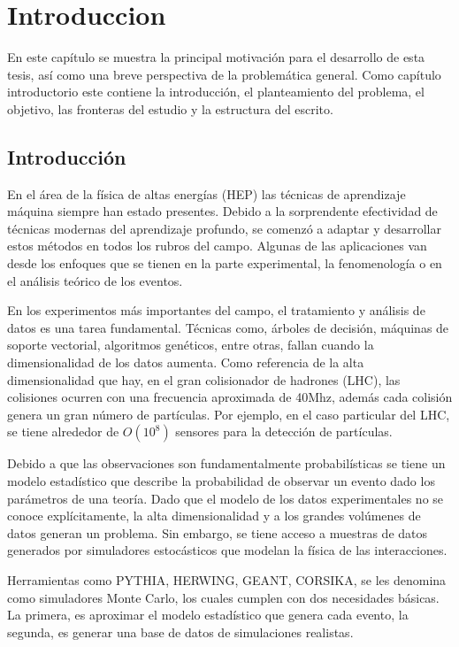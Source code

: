 \chapter{Introduccion}

\label{Chapter1}

En este capítulo se muestra la principal motivación para el desarrollo de esta tesis,
así como una breve perspectiva de la problemática general. Como capítulo introductorio este contiene la introducción, el planteamiento del problema, el objetivo, las fronteras del estudio y la estructura del escrito.

\section{Introducción}

En el área de la física de altas energías (HEP) las técnicas de aprendizaje máquina siempre han estado presentes. Debido a la sorprendente efectividad de técnicas modernas del aprendizaje profundo, se comenzó a adaptar y desarrollar estos métodos en todos los rubros del campo. Algunas de las aplicaciones van desde los enfoques que se tienen en la parte experimental, la fenomenología o en el análisis teórico de los eventos.

En los experimentos más importantes del campo, el tratamiento y análisis de datos es una tarea fundamental. Técnicas como, árboles de decisión, máquinas de soporte vectorial, algoritmos genéticos, entre otras, fallan cuando la dimensionalidad de los datos aumenta.
Como referencia de la alta dimensionalidad que hay, en el gran colisionador de hadrones (LHC), las colisiones ocurren con una frecuencia aproximada de 40Mhz, además cada colisión genera un gran número de partículas. Por ejemplo, en el caso particular del LHC, se tiene alrededor de $O(10^8)$ sensores para la detección de partículas.

Debido a que las observaciones son fundamentalmente probabilísticas se tiene un modelo estadístico que describe la probabilidad de observar un evento dado los parámetros de una teoría. Dado que el modelo de los datos experimentales no se conoce explícitamente, la alta dimensionalidad y a los grandes volúmenes de datos generan un problema. Sin embargo, se tiene acceso a muestras de datos generados por simuladores estocásticos que modelan la física de las interacciones. 

Herramientas como PYTHIA, HERWING, GEANT, CORSIKA, se les denomina como simuladores Monte Carlo, los cuales cumplen  con dos necesidades básicas. La primera, es aproximar el modelo estadístico que genera cada evento, la segunda, es generar una base de datos de simulaciones realistas.

